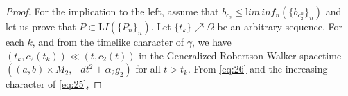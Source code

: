 \begin{proof}


        \smallskip

        For the implication to the left, assume that $b_{c_2}\leq {\mathrm lim\, inf}_n (\{b_{c_2^n}\}_n)$ and let us prove that $P\subset {\mathrm LI}(\{P_n\}_n)$. Let $\{t_k\}\nearrow \Omega$ be an arbitrary sequence. For each $k$, and from the timelike character of $\gamma$, we have $(t_k,c_2(t_k))\ll (t,c_2(t))$ in the Generalized Robertson-Walker spacetime $\left( (a,b)\times M_2,-dt^2+{\alpha_2}g_2\right)$ for all $t>t_k$. From \eqref{eq:26} and the increasing character of \eqref{eq:25},


\end{proof}
